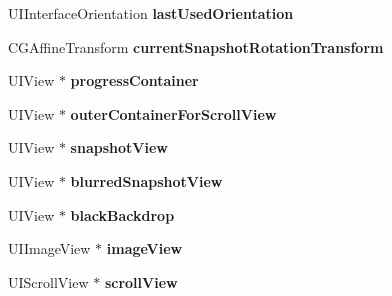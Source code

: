 \begin{DoxyCompactItemize}
\item 
\hypertarget{category_j_t_s_image_view_controller_07_08_a36b61a21fce818eecf6f4ac384b59772}{}U\+I\+Interface\+Orientation {\bfseries last\+Used\+Orientation}\label{category_j_t_s_image_view_controller_07_08_a36b61a21fce818eecf6f4ac384b59772}

\item 
\hypertarget{category_j_t_s_image_view_controller_07_08_a8a08b33f6515cec0fd97e145d01ffbdd}{}C\+G\+Affine\+Transform {\bfseries current\+Snapshot\+Rotation\+Transform}\label{category_j_t_s_image_view_controller_07_08_a8a08b33f6515cec0fd97e145d01ffbdd}

\item 
\hypertarget{category_j_t_s_image_view_controller_07_08_a8980ed6af729c23ee9b450c0771d1d10}{}U\+I\+View $\ast$ {\bfseries progress\+Container}\label{category_j_t_s_image_view_controller_07_08_a8980ed6af729c23ee9b450c0771d1d10}

\item 
\hypertarget{category_j_t_s_image_view_controller_07_08_a113dbcb214456541caf467ca58e896b5}{}U\+I\+View $\ast$ {\bfseries outer\+Container\+For\+Scroll\+View}\label{category_j_t_s_image_view_controller_07_08_a113dbcb214456541caf467ca58e896b5}

\item 
\hypertarget{category_j_t_s_image_view_controller_07_08_a7b35ead66def08d4a511a6ee70059584}{}U\+I\+View $\ast$ {\bfseries snapshot\+View}\label{category_j_t_s_image_view_controller_07_08_a7b35ead66def08d4a511a6ee70059584}

\item 
\hypertarget{category_j_t_s_image_view_controller_07_08_a43334287512c792c1c42d88b39ef96f8}{}U\+I\+View $\ast$ {\bfseries blurred\+Snapshot\+View}\label{category_j_t_s_image_view_controller_07_08_a43334287512c792c1c42d88b39ef96f8}

\item 
\hypertarget{category_j_t_s_image_view_controller_07_08_a40e1a255ebcabcb6881e02d3a376a192}{}U\+I\+View $\ast$ {\bfseries black\+Backdrop}\label{category_j_t_s_image_view_controller_07_08_a40e1a255ebcabcb6881e02d3a376a192}

\item 
\hypertarget{category_j_t_s_image_view_controller_07_08_a460e4d35deee1fa95350dd064501def2}{}U\+I\+Image\+View $\ast$ {\bfseries image\+View}\label{category_j_t_s_image_view_controller_07_08_a460e4d35deee1fa95350dd064501def2}

\item 
\hypertarget{category_j_t_s_image_view_controller_07_08_a58938db33a917eddd377e7538f26899b}{}U\+I\+Scroll\+View $\ast$ {\bfseries scroll\+View}\label{category_j_t_s_image_view_controller_07_08_a58938db33a917eddd377e7538f26899b}


\end{DoxyCompactItemize}
